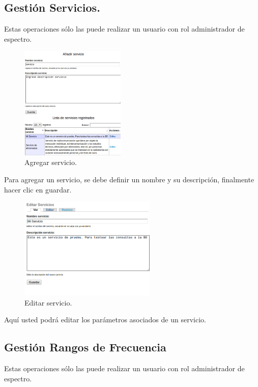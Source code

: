 \begin{multicols}{2}
\subsection*{Gestión Servicios.}

Estas operaciones sólo las puede realizar un usuario con rol administrador de espectro.


\begin{figure}[H]
	\centering
	\includegraphics[width=5cm]{Anexos/Imagenes/ManualUsuario/Servicios.png}
	\caption{Agregar servicio.}
\end{figure}

Para agregar un servicio, se debe definir un nombre y su descripción, finalmente hacer clic en guardar.	
	
\begin{figure}[H]
	\centering
	\includegraphics[width=6.5cm]{Anexos/Imagenes/ManualUsuario/EditarServicios.png}
	\caption{Editar servicio.}
\end{figure}

Aquí usted podrá editar los parámetros asociados de un servicio.
	
\subsection*{Gestión Rangos de Frecuencia}

Estas operaciones sólo las puede realizar un usuario con rol administrador de espectro.


\end{multicols}
